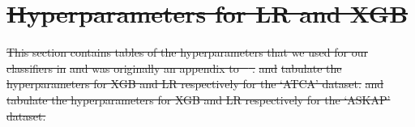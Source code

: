\documentclass[11pt, a4paper]{book}
\providecommand{\DIFdeltex}[1]{{\protect\color{red}\sout{#1}}}                      %
\providecommand{\DIFdel}[1]{\texorpdfstring{\DIFdeltex{#1}}{}} %
\begin{document}
\section{\DIFdel{Hyperparameters for LR and XGB}}
\addtocounter{section}{-1}%

\DIFdel{This section contains tables of the hyperparameters that we used for our classifiers in }%
\DIFdel{and was originally an appendix to \mbox{%
\citet{alger2021interpretable}}\hspace{0pt}%
. }%
\DIFdel{and }%
\DIFdel{tabulate the hyperparameters for XGB and LR respectively for the `ATCA' dataset. }%
\DIFdel{and }%
\DIFdel{tabulate the hyperparameters for XGB and LR respectively for the `ASKAP' dataset.
}%
\end{document}
